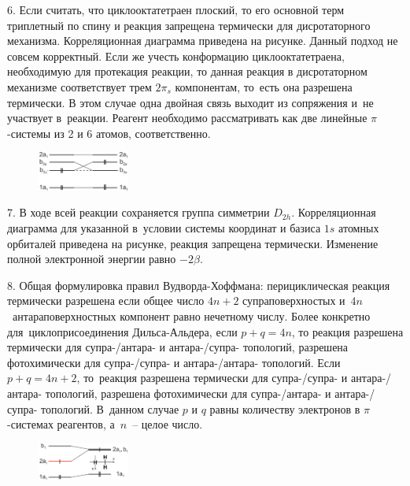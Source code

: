 6. Если считать, что циклооктатетраен плоский, то его основной терм триплетный по спину и реакция запрещена термически для дисротаторного механизма. Корреляционная диаграмма приведена на рисунке. Данный подход не совсем корректный. Если же учесть конформацию циклооктатетраена, необходимую для протекация реакции, то данная реакция в дисротаторном механизме соответствует трем $2\pi_s$ компонентам, то~есть она разрешена термически. В этом случае одна двойная связь выходит из сопряжения и~не участвует в~реакции. Реагент необходимо рассматривать как две линейные $\pi$-системы из 2 и 6 атомов, соответственно.\par
\begin{figure} %
    \centering
    \vspace{-1mm}
    \includegraphics[width=30mm]{images/Fig_2_1_7_dec.png}
    \vspace{-5mm}
\end{figure}
7. В ходе всей реакции сохраняется группа симметрии $D_{2h}$. Корреляционная диаграмма для указанной в~условии системы координат и базиса $1s$ атомных орбиталей приведена на рисунке, реакция запрещена термически. Изменение полной электронной энергии равно $-2\beta$.\par
8. Общая формулировка правил Вудворда-Хоффмана: перициклическая реакция термически разрешена если общее число $4n+2$ супраповерхностых и~$4n$~антараповерхностных компонент равно нечетному числу.  Более конкретно для~циклоприсоединения Дильса-Альдера, если $p+q=4n$, то реакция разрешена термически для супра-/антара- и антара-/супра- топологий, разрешена фотохимически для супра-/супра- и антара-/антара- топологий. Если $p+q=4n+2$, то~реакция разрешена термически для супра-/супра- и антара-/антара- топологий, разрешена фотохимически для супра-/антара- и антара-/супра- топологий. В~данном случае $p$ и $q$ равны количеству электронов в $\pi$-системах реагентов, а~$n$~– целое число.\par
\begin{figure} %
    \centering
    \vspace{0mm}
    \includegraphics[width=30mm]{images/Fig_2_1_9_dec.png}
    \vspace{-5mm}
\end{figure}
